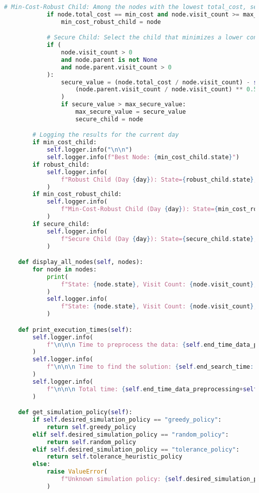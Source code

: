 \begin{lstlisting}[language = Python]
            # Min-Cost-Robust Child: Among the nodes with the lowest total_cost, select the one with the highest visit_count
            if node.total_cost == min_cost and node.visit_count >= max_visit_count:
                min_cost_robust_child = node

            # Secure Child: Select the child that minimizes a lower confidence bound
            if (
                node.visit_count > 0
                and node.parent is not None
                and node.parent.visit_count > 0
            ):
                secure_value = (node.total_cost / node.visit_count) - self.cp * (
                    (node.parent.visit_count / node.visit_count) ** 0.5
                )
                if secure_value > max_secure_value:
                    max_secure_value = secure_value
                    secure_child = node

        # Logging the results for the current day
        if min_cost_child:
            self.logger.info("\n\n")
            self.logger.info(f"Best Node: {min_cost_child.state}")
        if robust_child:
            self.logger.info(
                f"Robust Child (Day {day}): State={robust_child.state}, Visit Count={max_visit_count}"
            )
        if min_cost_robust_child:
            self.logger.info(
                f"Min-Cost-Robust Child (Day {day}): State={min_cost_robust_child.state}, Cost={min_cost}, Visit Count={min_cost_robust_child.visit_count}"
            )
        if secure_child:
            self.logger.info(
                f"Secure Child (Day {day}): State={secure_child.state}, Secure Value={max_secure_value}"
            )

    def display_all_nodes(self, nodes):
        for node in nodes:
            print(
                f"State: {node.state}, Visit Count: {node.visit_count}, Total Cost: {node.total_cost}"
            )
            self.logger.info(
                f"State: {node.state}, Visit Count: {node.visit_count}, Total Cost: {node.total_cost}"
            )

    def print_execution_times(self):
        self.logger.info(
            f"\n\n\n Time to preprocess the data: {self.end_time_data_preprocessing:.4f} seconds"
        )
        self.logger.info(
            f"\n\n\n Time to find the solution: {self.end_search_time:.4f} seconds"
        )
        self.logger.info(
            f"\n\n\n Total time: {self.end_time_data_preprocessing+self.end_search_time:.4f} seconds \n\n"
        )

    def get_simulation_policy(self):
        if self.desired_simulation_policy == "greedy_policy":
            return self.greedy_policy
        elif self.desired_simulation_policy == "random_policy":
            return self.random_policy
        elif self.desired_simulation_policy == "tolerance_policy":
            return self.tolerance_heuristic_policy
        else:
            raise ValueError(
                f"Unknown simulation policy: {self.desired_simulation_policy}"
            )


\end{lstlisting}
